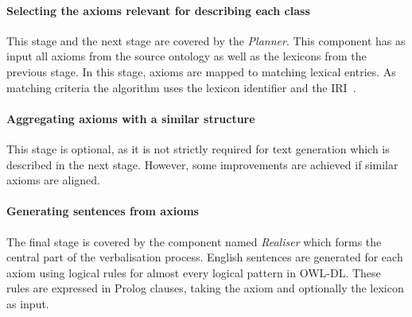 \documentclass[draft,final]{vutinfth} %
\begin{document}
\paragraph{Selecting the axioms relevant for describing each class} This stage and the next stage are covered by the \textit{Planner}.
This component has as input all axioms from the source ontology as well as the lexicons from the previous stage. In this stage, axioms are mapped to matching lexical entries. As matching criteria the algorithm uses the lexicon identifier and the IRI~\cite{rfc3987}. 

\paragraph{Aggregating axioms with a similar structure} This stage is optional, as it is not strictly required for text generation which is described in the next stage. However, some improvements are achieved if similar axioms are aligned. 

\paragraph{Generating sentences from axioms} The final stage is covered by the component named \textit{Realiser} which forms the central part of the
verbalisation process. English sentences are generated for each axiom using logical rules for almost every logical pattern in OWL-DL. These rules are expressed in Prolog clauses, taking the axiom and optionally the lexicon as input.
\end{document}
